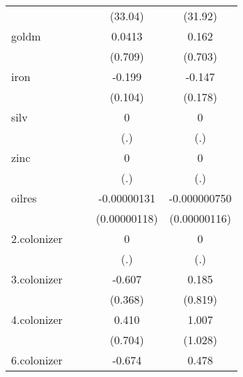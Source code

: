 {\begin{tabular}{l*{4}{c}}
            &                     &                     &     (33.04)         &     (31.92)         \\
[1em]
goldm       &                     &                     &      0.0413         &       0.162         \\
            &                     &                     &     (0.709)         &     (0.703)         \\
[1em]
iron        &                     &                     &      -0.199         &      -0.147         \\
            &                     &                     &     (0.104)         &     (0.178)         \\
[1em]
silv        &                     &                     &           0         &           0         \\
            &                     &                     &         (.)         &         (.)         \\
[1em]
zinc        &                     &                     &           0         &           0         \\
            &                     &                     &         (.)         &         (.)         \\
[1em]
oilres      &                     &                     & -0.00000131         &-0.000000750         \\
            &                     &                     &(0.00000118)         &(0.00000116)         \\
[1em]
2.colonizer &                     &                     &           0         &           0         \\
            &                     &                     &         (.)         &         (.)         \\
[1em]
3.colonizer &                     &                     &      -0.607         &       0.185         \\
            &                     &                     &     (0.368)         &     (0.819)         \\
[1em]
4.colonizer &                     &                     &       0.410         &       1.007         \\
            &                     &                     &     (0.704)         &     (1.028)         \\
[1em]
6.colonizer &                     &                     &      -0.674\sym{**} &       0.478         \\

\end{tabular}}
